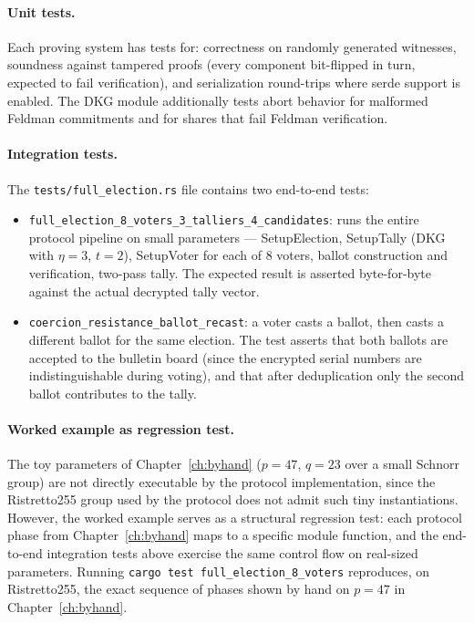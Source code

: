 \documentclass[12pt,a4paper,oneside]{report}
\begin{document}
\paragraph{Unit tests.}
Each proving system has tests for: correctness on randomly generated 
witnesses, soundness against tampered proofs (every component bit-flipped 
in turn, expected to fail verification), and serialization round-trips 
where serde support is enabled. The DKG module additionally tests 
abort behavior for malformed Feldman commitments and for shares that 
fail Feldman verification.

\paragraph{Integration tests.}
The \texttt{tests/full\_election.rs} file contains two end-to-end tests:

\begin{itemize}
    \item \texttt{full\_election\_8\_voters\_3\_talliers\_4\_candidates}: 
    runs the entire protocol pipeline on small parameters --- 
    \textsf{SetupElection}, \textsf{SetupTally} (DKG with $\eta = 3$, 
    $t = 2$), \textsf{SetupVoter} for each of 8 voters, ballot 
    construction and verification, two-pass tally. The expected result 
    is asserted byte-for-byte against the actual decrypted tally vector.
    \item \texttt{coercion\_resistance\_ballot\_recast}: a voter casts 
    a ballot, then casts a different ballot for the same election. The 
    test asserts that both ballots are accepted to the bulletin board 
    (since the encrypted serial numbers are indistinguishable during 
    voting), and that after deduplication only the second ballot 
    contributes to the tally.
\end{itemize}

\paragraph{Worked example as regression test.}
The toy parameters of Chapter~\ref{ch:byhand} ($p = 47$, $q = 23$ over 
a small Schnorr group) are not directly executable by the protocol 
implementation, since the Ristretto255 group used by the protocol does 
not admit such tiny instantiations. However, the worked example serves 
as a structural regression test: each protocol phase from 
Chapter~\ref{ch:byhand} maps to a specific module function, and the 
end-to-end integration tests above exercise the same control flow on 
real-sized parameters. Running 
\texttt{cargo test full\_election\_8\_voters} reproduces, on Ristretto255, 
the exact sequence of phases shown by hand on $p = 47$ in 
Chapter~\ref{ch:byhand}.
\end{document}
